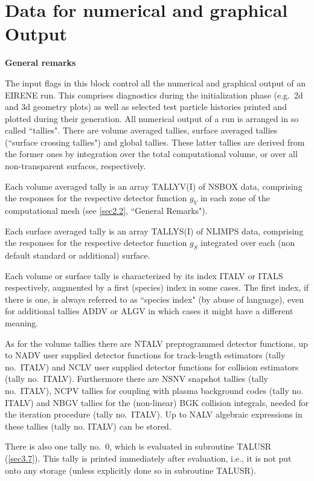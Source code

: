 \section{Data for numerical and graphical Output} \label{sec2.11}

\textbf{General remarks}

\medskip

The input flags in this block control all the numerical and graphical output of
an EIRENE run.
%
This comprises diagnostics during the initialization phase (e.g.\ 2d and 3d
geometry plots) as well as selected test particle histories printed and plotted
during their generation.
All numerical output of a run is arranged in so called ``tallies".
There are volume averaged tallies, surface averaged tallies (``surface crossing
tallies") and global tallies.
These latter tallies are derived from the former ones by integration over the
total computational volume, or over all non-transparent surfaces, respectively.

Each volume averaged tally is an array TALLYV(I) of NSBOX data, comprising the
responses for the respective detector function $g_V $ in each zone of the
computational mesh (see \cref{sec2.2}, ``General Remarks").

Each surface averaged tally is an array TALLYS(I) of NLIMPS data, comprising
the responses for the respective detector function $g_S $ integrated over each
(non default standard or additional) surface.

Each volume or surface tally is characterized by its index ITALV or ITALS
respectively, augmented by a first (species) index in some cases.
The first index, if there is one, is always referred to as ``species index" (by
abuse of language), even for additional tallies ADDV or ALGV in which cases it
might have a different meaning.

As for the volume tallies there are NTALV preprogrammed detector functions, up
to NADV user supplied detector functions for track-length estimators (tally
no.\ ITALV) and NCLV user supplied detector functions for collision estimators
(tally no.\ ITALV).
Furthermore there are NSNV snapshot tallies (tally no.\ ITALV), NCPV tallies
for coupling with plasma background codes (tally no.
ITALV) and NBGV tallies for the (non-linear) \ac{BGK} collision integrals,
needed for the iteration procedure (tally no.\ ITALV).
Up to NALV algebraic expressions in these tallies (tally no.
ITALV) can be stored.

There is also one tally no.\ 0, which is evaluated in subroutine TALUSR
(\cref{sec3.7}).
This tally is printed immediately after evaluation, i.e., it is not put onto
any storage (unless explicitly done so in subroutine TALUSR).


